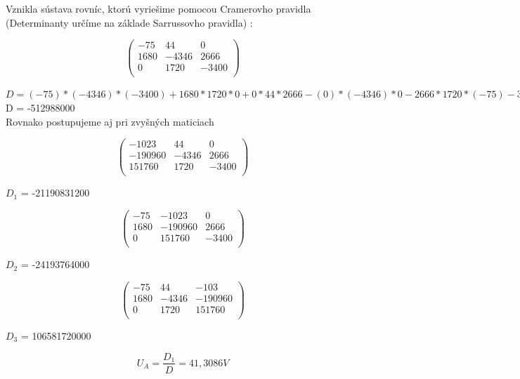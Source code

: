 \documentclass[a4paper,12pt]{article}
\begin{document}
\begin{flushleft}
Vznikla sústava rovníc, ktorú vyriešime pomocou Cramerovho pravidla (Determinanty určíme na základe Sarrussovho pravidla) : 
\end{flushleft}
 
$$
\begin{pmatrix}
-75 & 44 & 0 \\
1680 & -4346 & 2666 \\
0 & 1720 & -3400 \\
\end{pmatrix}
$$

\begin{center}
$D = (-75)*(-4346)*(-3400)+1680*1720*0+0*44*2666-(0)*(-4346)*0-2666*1720*(-75)-3400*44*1680$ \\
D = -512988000\\
Rovnako postupujeme aj pri zvyšných maticiach
\end{center}
 
$$
\begin{pmatrix}
-1023 & 44 & 0 \\
-190960 & -4346 & 2666 \\
151760 & 1720 & -3400 \\
\end{pmatrix}
$$

\begin{center}
$D_1$ = -21190831200
\end{center}
 
$$
\begin{pmatrix}
-75 & -1023 & 0 \\
1680 & -190960 & 2666 \\
0 & 151760 & -3400 \\
\end{pmatrix}
$$

\begin{center}
$D_2$ = -24193764000
\end{center}
 
$$
\begin{pmatrix}
-75 & 44 & -103 \\
1680 & -4346 & -190960 \\
0 & 1720 & 151760 \\
\end{pmatrix}
$$

\begin{center}
$D_3$ = 106581720000
\end{center}

\begin{equation*}
U_A = \frac{D_1}{D} = 41,3086 V
\end{equation*} 
\end{document}
